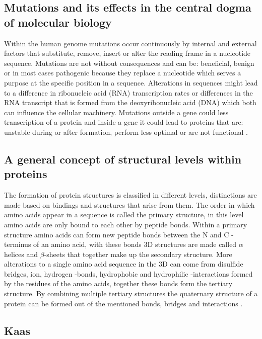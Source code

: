 \subsection{Mutations and its effects in the central dogma of molecular biology}
Within the human genome mutations occur continuously by internal and external factors that substitute, remove, insert or alter the reading frame in a nucleotide sequence. Mutations are not without consequences and can be: beneficial, benign or in most cases pathogenic because they replace a nucleotide which serves a purpose at the specific position in a sequence. Alterations in sequences might lead to a difference in ribonucleic acid (RNA) transcription rates or differences in the RNA transcript that is formed from the deoxyribonucleic acid (DNA) which both can influence the cellular machinery. Mutations outside a gene could less transcription of a protein and inside a gene it could lead to proteins that are: unstable during or after formation, perform less optimal or are not functional \cite{}.

\subsection{A general concept of structural levels within proteins}
The formation of protein structures is classified in different levels, distinctions are made based on bindings and structures that arise from them. 
The order in which amino acids appear in a sequence is called the primary structure, in this level amino acids are only bound to each other by peptide bonds. 
Within a primary structure amino acids can form new peptide bonds between the N and C -terminus of an amino acid, with these bonds 3D structures are made called $\alpha$ helices and $\beta$-sheets that together make up the secondary structure.
More alterations to a single amino acid sequence in the 3D can come from disulfide bridges, ion, hydrogen -bonds, hydrophobic and hydrophilic -interactions formed by the residues of the amino acids, together these bonds form the tertiary structure.
By combining multiple tertiary structures the quaternary structure of a protein can be formed out of the mentioned bonds, bridges and interactions \cite{}.


\subsection{Kaas}

